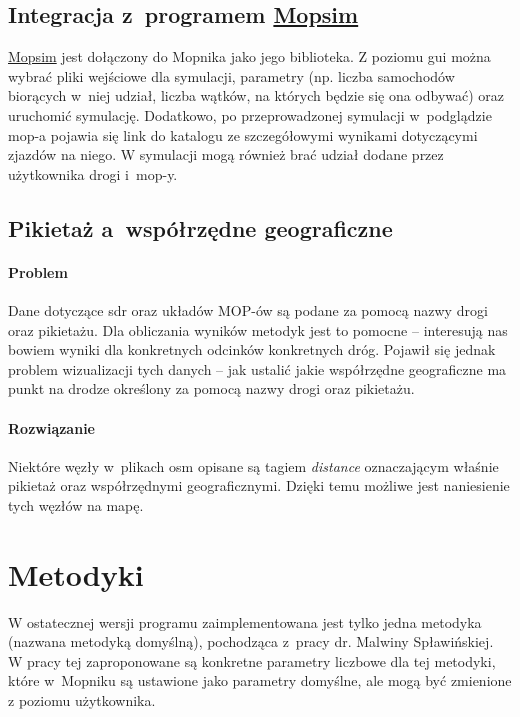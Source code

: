 \subsection{Integracja z~programem \hyperref[r:mopsim]{Mopsim}}
\hyperref[r:mopsim]{Mopsim} jest dołączony do Mopnika jako jego biblioteka. Z
poziomu \acrshort{gui} można wybrać pliki wejściowe dla symulacji,
parametry (np. liczba samochodów biorących w~niej udział, liczba wątków,
na których będzie się ona odbywać) oraz uruchomić symulację. Dodatkowo,
po przeprowadzonej symulacji w~podglądzie \acrshort{mop}-a pojawia się link do
katalogu ze szczegółowymi wynikami dotyczącymi zjazdów na niego. W symulacji
mogą również brać udział dodane przez użytkownika drogi i~\acrshort{mop}-y.
\subsection{Pikietaż a~współrzędne geograficzne}
\paragraph{Problem} Dane dotyczące \acrshort{sdr} oraz układów MOP-ów są podane
za pomocą nazwy drogi oraz pikietażu. Dla obliczania wyników metodyk jest to
pomocne -- interesują nas bowiem wyniki dla konkretnych odcinków konkretnych
dróg. Pojawił się jednak problem wizualizacji tych danych -- jak ustalić jakie
współrzędne geograficzne ma punkt na drodze określony za pomocą nazwy drogi
oraz pikietażu.
\paragraph{Rozwiązanie} Niektóre węzły w~plikach \acrshort{osm} opisane są tagiem
\textit{distance} oznaczającym
właśnie pikietaż oraz współrzędnymi geograficznymi. Dzięki temu możliwe jest
naniesienie tych węzłów na mapę. 

\section{Metodyki}
W ostatecznej wersji programu zaimplementowana jest tylko jedna metodyka
(nazwana metodyką domyślną),
pochodząca z~pracy dr. Malwiny Spławińskiej\cite{metodyki}.
W pracy tej zaproponowane są konkretne parametry liczbowe dla tej metodyki,
które w~Mopniku są ustawione jako parametry domyślne, ale mogą być zmienione
z poziomu użytkownika.
